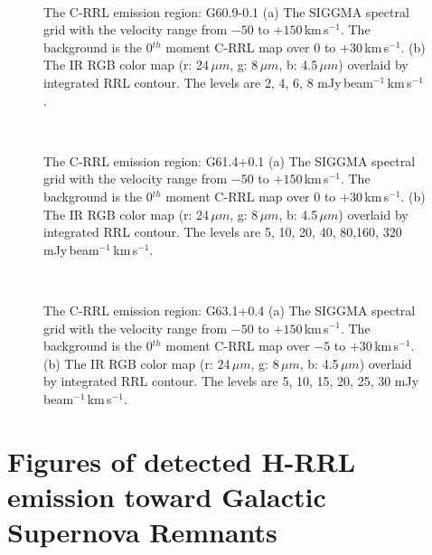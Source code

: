 \documentclass[manuscript]{aastex61}
\newcommand{\kms}{\,km\,s$^{-1}$}
\newcommand{\um}{\mu m}
\begin{document}
\begin{figure}[H]
	\centering
	\\ 
	\caption{The C-RRL emission region: G60.9-0.1
	(a) The SIGGMA spectral grid with the velocity range from $-50$ to $+150$\kms.
	The background is the 0$^{th}$ moment C-RRL map over $0$ to $+30$\kms.
	(b) The IR RGB color map (r: 24\,$\um$, g: 8\,$\um$, b: 4.5\,$\um$) overlaid by integrated RRL contour.
	The levels are 2, 4, 6, 8 mJy\,beam$^{-1}$\kms.}
	\label{fig_crrl-g609}
\end{figure}
\begin{figure}[H]
	\centering
	\\
	\caption{The C-RRL emission region: G61.4+0.1
	(a) The SIGGMA spectral grid with the velocity range from $-50$ to $+150$\kms.
	The background is the 0$^{th}$ moment C-RRL map over $0$ to $+30$\kms.
	(b) The IR RGB color map (r: 24\,$\um$, g: 8\,$\um$, b: 4.5\,$\um$) overlaid by integrated RRL contour.
	The levels are 5, 10, 20, 40, 80,160, 320 mJy\,beam$^{-1}$\kms.}
	\label{fig_crrl-g614}
\end{figure}
\begin{figure}[H]
	\centering
	\\ 
	\caption{The C-RRL emission region: G63.1+0.4
	(a) The SIGGMA spectral grid with the velocity range from $-50$ to $+150$\kms.
	The background is the 0$^{th}$ moment C-RRL map over $-5$ to $+30$\kms.
	(b) The IR RGB color map (r: 24\,$\um$, g: 8\,$\um$, b: 4.5\,$\um$) overlaid by integrated RRL contour.
	The levels are 5, 10, 15, 20, 25, 30 mJy\,beam$^{-1}$\kms.}
	\label{fig_crrl-g631}
\end{figure}

\newpage

\section{Figures of detected H-RRL emission toward Galactic Supernova Remnants}\label{appe:snr}
\end{document}
